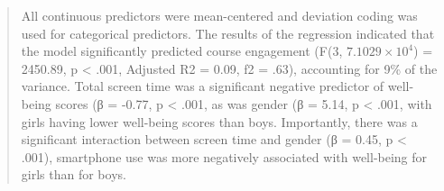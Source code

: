 \documentclass[]{book}
\newenvironment{Shaded}{\begin{snugshade}}{\end{snugshade}}
\newcommand{\ControlFlowTok}[1]{\textcolor[rgb]{0.13,0.29,0.53}{\textbf{#1}}}
\newcommand{\DataTypeTok}[1]{\textcolor[rgb]{0.13,0.29,0.53}{#1}}
\newcommand{\DecValTok}[1]{\textcolor[rgb]{0.00,0.00,0.81}{#1}}
\newcommand{\ErrorTok}[1]{\textcolor[rgb]{0.64,0.00,0.00}{\textbf{#1}}}
\newcommand{\FloatTok}[1]{\textcolor[rgb]{0.00,0.00,0.81}{#1}}
\newcommand{\KeywordTok}[1]{\textcolor[rgb]{0.13,0.29,0.53}{\textbf{#1}}}
\newcommand{\NormalTok}[1]{#1}
\newcommand{\OperatorTok}[1]{\textcolor[rgb]{0.81,0.36,0.00}{\textbf{#1}}}
\newcommand{\StringTok}[1]{\textcolor[rgb]{0.31,0.60,0.02}{#1}}
\begin{document}
\begin{Shaded}
\end{Shaded}

\begin{quote}
All continuous predictors were mean-centered and deviation coding was used for categorical predictors. The results of the regression indicated that the model significantly predicted course engagement (F(3, \ensuremath{7.1029\times 10^{4}}) = 2450.89, p \textless{} .001, Adjusted R2 = 0.09, f2 = .63), accounting for 9\% of the variance. Total screen time was a significant negative predictor of well-being scores (β = -0.77, p \textless{} .001, as was gender (β = 5.14, p \textless{} .001, with girls having lower well-being scores than boys. Importantly, there was a significant interaction between screen time and gender (β = 0.45, p \textless{} .001), smartphone use was more negatively associated with well-being for girls than for boys.
\end{quote}
\end{document}
